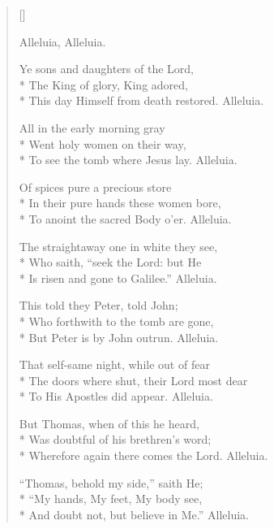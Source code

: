 \newHymn
{}

\begin{verse}[\versewidth]

 Alleluia, Alleluia.

Ye sons and daughters of the Lord,\\*
The King of glory, King adored,                  \\* 
This day Himself from death restored. Alleluia.
\pointorig

All in the early morning gray\\*
Went holy women on their way,               \\*      
To see the tomb where Jesus lay. Alleluia.

Of spices pure a precious store  \\*
In their pure hands these women bore,\\*
To anoint the sacred Body o'er.  Alleluia.

The straightaway one in white they see,\\*           
Who saith, ``seek the Lord: but He        \\*         
Is risen and gone to Galilee.''
Alleluia.

This told they Peter, told John; \\*
Who forthwith to the tomb are gone,  \\*
But Peter is by John outrun.                      
      Alleluia.

That self-same night, while out of fear\\*
The doors where shut, their Lord most dear        \\*
To His Apostles did appear.                       
    Alleluia.

But Thomas, when of this he heard,     \\*           
Was doubtful of his brethren's word;              \\*
Wherefore again there comes the Lord.             
              Alleluia.

``Thomas, behold my side,'' saith He;  \\*             
``My hands, My feet, My body see, \\*
And doubt not, but believe in Me.''          
    Alleluia.



\end{verse}
